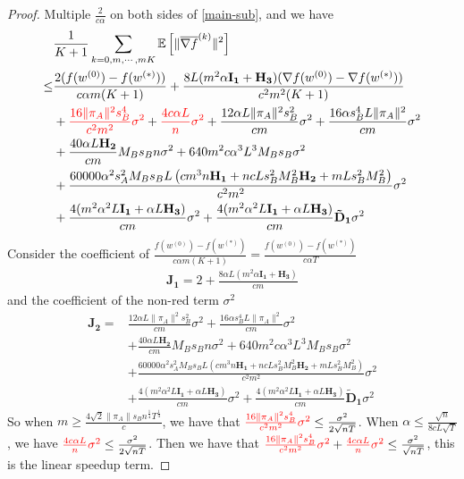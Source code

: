 \documentclass{article}
\newcommand{\EE}[1]{\mathbb{E}\left[#1\right]}
\newcommand{\norm}[1]{\| #1 \|}
\begin{document}
\begin{proof}
  Multiple $\frac{2}{c\alpha}$ on both sides of \ref{main-sub}, and we have
  \begin{align*}
    &\frac{1}{K+1}\sum_{k=0,m,\cdots,mK}\EE{\norm{\overline{\nabla f}^{(k)}}^2}\label{main-sub}
  \\\leq& \frac{2(f(w^{(0)})-f(w^{(*)}))}{c\alpha m(K+1)}+\frac{8L(m^2\alpha \mathbf{I_1}+ \mathbf{H_3})(\nabla f(w^{(0)})-\nabla f(w^{(*)}))}{c^2 m^2(K+1)}\nonumber\\&+\textcolor{red}{\frac{16 \norm{\pi_A}^2s_B^4}{c^2 m^2}\sigma^2}+\textcolor{red}{ \frac{4c\alpha L}{n}\sigma^2}+\frac{12\alpha L\norm{\pi_A}^2s_B^2}{c m}\sigma^2+\frac{16\alpha s_B^4L\norm{\pi_A}^2}{c m}\sigma^2\nonumber\\&+\frac{40\alpha L \mathbf{H_2}}{c m}M_Bs_Bn \sigma^2+640m^2c\alpha^3L^3M_Bs_B\sigma^2\nonumber\\&+\frac{60000\alpha^2 s_A^2M_Bs_BL \left(cm^3n\mathbf{H_1}+nc Ls_B^2M_B^2\mathbf{H_2} +mLs_B^2M_B^2\right)}{c^2m^2}\sigma^2\nonumber\\&+\frac{4(m^2\alpha^2L\mathbf{I_1}+\alpha L \mathbf{H_3})}{c m}\sigma^2+\frac{4(m^2\alpha^2L\mathbf{I_1}+\alpha L \mathbf{H_3})}{c m}\mathbf{\tilde{D}_1}\sigma^2\nonumber
  \end{align*}
  Consider the coefficient of $\frac{f(w^{(0)})-f(w^{(*)})}{c\alpha m(K+1)}=\frac{f(w^{(0)})-f(w^{(*)})}{c\alpha T}$
  \begin{align*}
    \mathbf{J_1}=2+\frac{8\alpha L(m^2\alpha \mathbf{I_1}+ \mathbf{H_3})}{c m}
  \end{align*}
  and the coefficient of the non-red term $\sigma^2$
  \begin{align*}
    \mathbf{J_2}=&\frac{12\alpha L\norm{\pi_A}^2s_B^2}{c m}\sigma^2+\frac{16\alpha s_B^4L\norm{\pi_A}^2}{c m}\sigma^2\nonumber\\&+\frac{40\alpha L \mathbf{H_2}}{c m}M_Bs_Bn \sigma^2+640m^2c\alpha^3L^3M_Bs_B\sigma^2\nonumber\\&+\frac{60000\alpha^2 s_A^2M_Bs_BL \left(cm^3n\mathbf{H_1}+nc Ls_B^2M_B^2\mathbf{H_2} +mLs_B^2M_B^2\right)}{c^2m^2}\sigma^2\nonumber\\&+\frac{4(m^2\alpha^2L\mathbf{I_1}+\alpha L \mathbf{H_3})}{c m}\sigma^2+\frac{4(m^2\alpha^2L\mathbf{I_1}+\alpha L \mathbf{H_3})}{c m}\mathbf{\tilde{D}_1}\sigma^2\nonumber
  \end{align*}
  So when $m \geq \frac{4\sqrt{2}\norm{\pi_A}s_Bn^{\frac{1}{4}}T^{\frac{1}{4}}}{c}$, we have that $\textcolor{red}{\frac{16 \norm{\pi_A}^2s_B^4}{c^2m^2}\sigma^2}\leq \frac{\sigma^2}{2\sqrt{nT}}$. When $\alpha \leq \frac{\sqrt{n}}{8cL\sqrt{T}}$, we have $\textcolor{red}{ \frac{4c\alpha L}{n}\sigma^2}\leq \frac{\sigma^2}{2\sqrt{nT}}$. Then we have that $\textcolor{red}{\frac{16 \norm{\pi_A}^2s_B^4}{c^2m^2}\sigma^2}+\textcolor{red}{ \frac{4c\alpha L}{n}\sigma^2} \leq \frac{\sigma^2}{\sqrt{nT}}$, this is the linear speedup term.


\end{proof}
\end{document}
